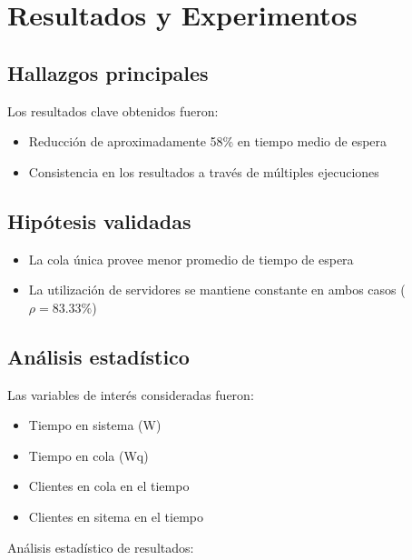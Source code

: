 \documentclass{article}
\begin{document}
\section{Resultados y Experimentos}\label{sec:resultados}

\subsection{Hallazgos principales}

Los resultados clave obtenidos fueron:
\begin{itemize}
    \item Reducción de aproximadamente 58\% en tiempo medio de espera
    \item Consistencia en los resultados a través de múltiples ejecuciones
\end{itemize}

\subsection{Hipótesis validadas}
\begin{itemize}
    \item La cola única provee menor promedio de tiempo de espera 
    \item La utilización de servidores se mantiene constante en ambos casos ($\rho = 83.33\%$)
\end{itemize}

\subsection{Análisis estadístico}
Las variables de interés consideradas fueron:

\begin{itemize}
    \item Tiempo en sistema (W)
    \item Tiempo en cola (Wq)
    \item Clientes en cola en el tiempo
    \item Clientes en sitema en el tiempo
\end{itemize}

Análisis estadístico de resultados:
\end{document}
